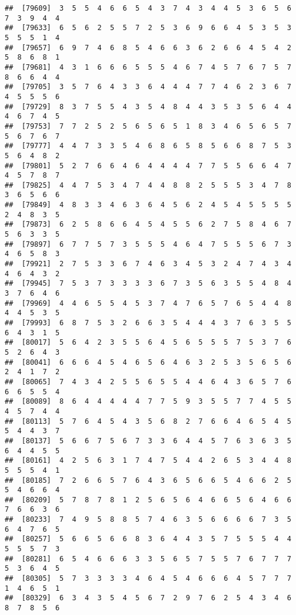 \documentclass[
]{book}
\begin{document}
\begin{verbatim}
##  [79609]  3  5  5  4  6  6  5  4  3  7  4  3  4  4  5  3  6  5  6  7  3  9  4  4
##  [79633]  6  5  6  2  5  5  7  2  5  3  6  9  6  6  4  5  3  5  3  5  5  5  1  4
##  [79657]  6  9  7  4  6  8  5  4  6  6  3  6  2  6  6  4  5  4  2  5  8  6  8  1
##  [79681]  4  3  1  6  6  6  5  5  5  4  6  7  4  5  7  6  7  5  7  8  6  6  4  4
##  [79705]  3  5  7  6  4  3  3  6  4  4  4  7  7  4  6  2  3  6  7  4  5  5  5  6
##  [79729]  8  3  7  5  5  4  3  5  4  8  4  4  3  5  3  5  6  4  4  4  6  7  4  5
##  [79753]  7  7  2  5  2  5  6  5  6  5  1  8  3  4  6  5  6  5  7  5  6  7  6  7
##  [79777]  4  4  7  3  3  5  4  6  8  6  5  8  5  6  6  8  7  5  3  5  6  4  8  2
##  [79801]  5  2  7  6  6  4  6  4  4  4  4  7  7  5  5  6  6  4  7  4  5  7  8  7
##  [79825]  4  4  7  5  3  4  7  4  4  8  8  2  5  5  5  3  4  7  8  3  6  5  6  6
##  [79849]  4  8  3  3  4  6  3  6  4  5  6  2  4  5  4  5  5  5  5  2  4  8  3  5
##  [79873]  6  2  5  8  6  6  4  5  4  5  5  6  2  7  5  8  4  6  7  5  6  3  3  5
##  [79897]  6  7  7  5  7  3  5  5  5  4  6  4  7  5  5  5  6  7  3  4  6  5  8  3
##  [79921]  2  7  5  3  3  6  7  4  6  3  4  5  3  2  4  7  4  3  4  4  6  4  3  2
##  [79945]  7  5  3  7  3  3  3  3  6  7  3  5  6  3  5  5  4  8  4  3  7  6  4  6
##  [79969]  4  4  6  5  5  4  5  3  7  4  7  6  5  7  6  5  4  4  8  4  4  5  3  5
##  [79993]  6  8  7  5  3  2  6  6  3  5  4  4  4  3  7  6  3  5  5  6  4  3  1  5
##  [80017]  5  6  4  2  3  5  5  6  4  5  6  5  5  5  7  5  3  7  6  5  2  6  4  3
##  [80041]  6  6  6  4  5  4  6  5  6  4  6  3  2  5  3  5  6  5  6  2  4  1  7  2
##  [80065]  7  4  3  4  2  5  5  6  5  5  4  4  6  4  3  6  5  7  6  6  6  5  5  4
##  [80089]  8  6  4  4  4  4  4  7  7  5  9  3  5  5  7  7  4  5  5  4  5  7  4  4
##  [80113]  5  7  6  4  5  4  3  5  6  8  2  7  6  6  4  6  5  4  5  5  4  4  3  7
##  [80137]  5  6  6  7  5  6  7  3  3  6  4  4  5  7  6  3  6  3  5  6  4  4  5  5
##  [80161]  4  2  5  6  3  1  7  4  7  5  4  4  2  6  5  3  4  4  8  5  5  5  4  1
##  [80185]  7  2  6  6  5  7  6  4  3  6  5  6  6  5  4  6  6  2  5  5  4  6  6  4
##  [80209]  5  7  8  7  8  1  2  5  6  5  6  4  6  6  5  6  4  6  6  7  6  6  3  6
##  [80233]  7  4  9  5  8  8  5  7  4  6  3  5  6  6  6  6  7  3  5  6  4  7  6  5
##  [80257]  5  6  6  5  6  6  8  3  6  4  4  3  5  7  5  5  5  4  4  5  5  5  7  3
##  [80281]  6  5  4  6  6  6  3  3  5  6  5  7  5  5  7  6  7  7  7  5  3  6  4  5
##  [80305]  5  7  3  3  3  3  4  6  4  5  4  6  6  6  4  5  7  7  7  1  4  6  5  1
##  [80329]  6  3  4  3  5  4  5  6  7  2  9  7  6  2  5  4  3  4  6  8  7  8  5  6

\end{verbatim}
\end{document}
